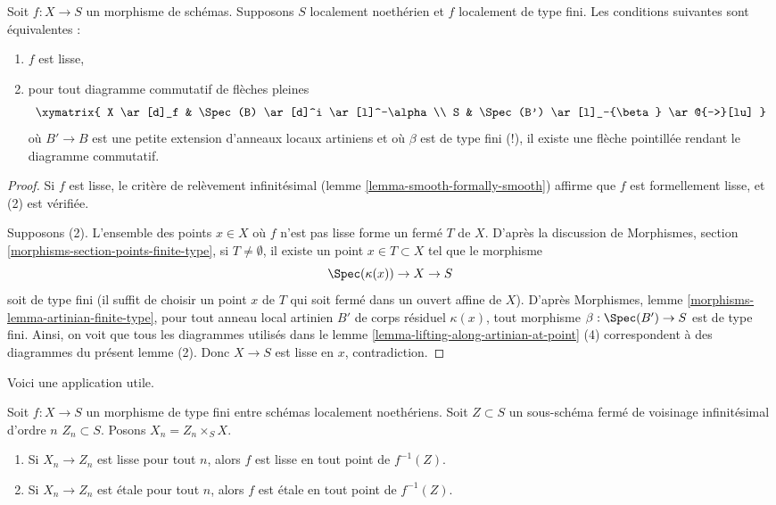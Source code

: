 \begin{lemma}
\label{lemma-lifting-along-artinian}
Soit $f : X \to S$ un morphisme de schémas.
Supposons $S$ localement noethérien et $f$ localement de type fini.
Les conditions suivantes sont équivalentes :
\begin{enumerate}
\item $f$ est lisse,
\item pour tout diagramme commutatif de flèches pleines
$$
\xymatrix{
X \ar[d]_f & \Spec(B) \ar[d]^i \ar[l]^-\alpha \\
S & \Spec(B') \ar[l]_-{\beta} \ar@{-->}[lu]
}
$$
où $B' \to B$ est une petite extension d'anneaux locaux artiniens
et où $\beta$ est de type fini (!), il existe une flèche pointillée rendant
le diagramme commutatif.
\end{enumerate}
\end{lemma}

\begin{proof}
Si $f$ est lisse, le critère de relèvement infinitésimal
(lemme \ref{lemma-smooth-formally-smooth}) affirme que
$f$ est formellement lisse, et (2) est vérifiée.

\medskip\noindent
Supposons (2). L'ensemble des points $x \in X$ où $f$ n'est pas lisse
forme un fermé $T$ de $X$. D'après la discussion de Morphismes,
section \ref{morphisms-section-points-finite-type}, si $T \not = \emptyset$,
il existe un point $x \in T \subset X$ tel que le morphisme
$$
\Spec(\kappa(x)) \to X \to S
$$
soit de type fini (il suffit de choisir un point $x$ de $T$ qui soit fermé
dans un ouvert affine de $X$). D'après
Morphismes, lemme \ref{morphisms-lemma-artinian-finite-type}, pour tout
anneau local artinien $B'$ de corps résiduel $\kappa(x)$, tout
morphisme $\beta : \Spec(B') \to S$ est de type fini. Ainsi,
on voit que tous les diagrammes utilisés dans
le lemme \ref{lemma-lifting-along-artinian-at-point} (4) correspondent
à des diagrammes du présent lemme (2). Donc $X \to S$ est lisse
en $x$, contradiction.
\end{proof}

\noindent
Voici une application utile.

\begin{lemma}
\label{lemma-check-smoothness-on-infinitesimal-nbhds}
Soit $f : X \to S$ un morphisme de type fini entre schémas localement noethériens.
Soit $Z \subset S$ un sous-schéma fermé de voisinage infinitésimal d'ordre $n$
$Z_n \subset S$. Posons $X_n = Z_n \times_S X$.
\begin{enumerate}
\item Si $X_n \to Z_n$ est lisse pour tout $n$, alors $f$
est lisse en tout point de $f^{-1}(Z)$.
\item Si $X_n \to Z_n$ est étale pour tout $n$, alors $f$
est étale en tout point de $f^{-1}(Z)$.
\end{enumerate}
\end{lemma}


